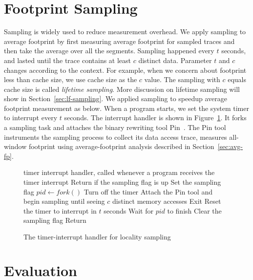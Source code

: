 \section{Footprint Sampling}
\label{sec:sampling}
Sampling is widely used to reduce measurement overhead. We apply
sampling to average footprint by first measuring average footprint for
sampled traces and then take the average over all the
segments. Sampling happened every $t$ seconds, and lasted until
the trace contains at least $c$ distinct data. Parameter $t$ and $c$
changes according to the context. For example, when we concern about
 footprint less than cache size, we use cache size as the $c$
 value. The sampling with $c$ equals cache size is called
 \emph{lifetime sampling}. More discussion on lifetime sampling will
 show in Section~\ref{sec:lf-sampling}. We applied sampling to speedup average
 footprint measurement as below. When a program
starts, we set the system timer to interrupt every $t$ seconds.
The interrupt handler is shown in Figure~\ref{alg:fp-sampling}.  It forks
a sampling task and attaches the binary rewriting tool
Pin~\cite{Pin:PLDI05}.  The Pin tool instruments the sampling process
to collect its data access trace, measures all-window footprint using
average-footprint analysis described in Section~\ref{sec:avg-fp}.

\renewcommand{\algorithmicrequire}{\textbf{Procedure}}

\begin{figure}[t!]
 \centering
 \begin{minipage}{\linewidth}
   \begin{algorithmic}[1]
     \REQUIRE timer interrupt handler, called whenever a program receives the
     timer interrupt
     \STATE Return if the sampling flag is up
     \STATE Set the sampling flag
     \STATE $pid \gets fork()$
        \STATE Turn off the timer
         \STATE Attach the Pin tool and begin sampling until seeing
         $c$ distinct memory accesses
         \STATE Exit
     \ELSE
         \STATE Reset the timer to interrupt in $t$ seconds
         \STATE Wait for $pid$ to finish
         \STATE Clear the sampling flag
         \STATE Return
     \ENDIF
   \end{algorithmic}
   \caption{The timer-interrupt handler for locality sampling}
   \label{alg:fp-sampling}
 \end{minipage}
\end{figure}



\section{Evaluation}

